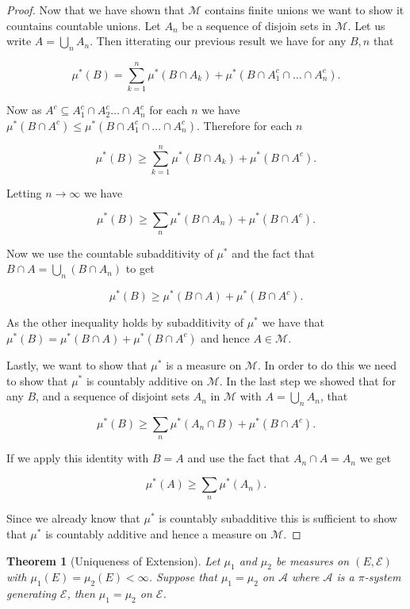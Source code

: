 \documentclass[
]{book}
\newtheorem{theorem}{Theorem}[chapter]
\theoremstyle{definition}
\theoremstyle{definition}
\theoremstyle{definition}
\theoremstyle{definition}
\theoremstyle{remark}
\begin{document}
\begin{proof}
Now that we have shown that \(\mathscr{M}\) contains finite unions we want to show it countains countable unions. Let \(A_n\) be a sequence of disjoin sets in \(\mathscr{M}\). Let us write \(A = \bigcup_n A_n\). Then itterating our previous result we have for any \(B, n\) that

\[ \mu^*(B) = \sum_{k=1}^n \mu^*(B \cap A_k) + \mu^*( B \cap A_1^c \cap \dots \cap A_n^c). \]

Now as \(A^c \subseteq A_1^c \cap A_2^c \dots \cap A_n^c\) for each \(n\) we have \(\mu^*(B \cap A^c) \leq \mu^*(B \cap A_1^c \cap \dots \cap A_n^c)\). Therefore for each \(n\)

\[ \mu^*(B) \geq \sum_{k=1}^n \mu^*(B \cap A_k) + \mu^*(B \cap A^c). \]

Letting \(n \rightarrow \infty\) we have

\[ \mu^*(B) \geq \sum_n \mu^*(B \cap A_n) + \mu^*(B \cap A^c). \]

Now we use the countable subadditivity of \(\mu^*\) and the fact that \(B \cap A = \bigcup_n (B \cap A_n)\) to get

\[ \mu^*(B) \geq \mu^*(B \cap A) + \mu^*(B \cap A^c). \]

As the other inequality holds by subadditivity of \(\mu^*\) we have that \(\mu^*(B) = \mu^*(B \cap A) + \mu^*(B \cap A^c)\) and hence \(A \in \mathscr{M}\).

Lastly, we want to show that \(\mu^*\) is a measure on \(\mathscr{M}\). In order to do this we need to show that \(\mu^*\) is countably additive on \(\mathscr{M}\). In the last step we showed that for any \(B\), and a sequence of disjoint sets \(A_n\) in \(\mathscr{M}\) with \(A= \bigcup_n A_n\), that

\[ \mu^*(B) \geq \sum_n \mu^*(A_n \cap B) + \mu^*(B \cap A^c). \]

If we apply this identity with \(B=A\) and use the fact that \(A_n \cap A = A_n\) we get

\[ \mu^*(A) \geq \sum_n \mu^*(A_n). \]

Since we already know that \(\mu^*\) is countably subadditive this is sufficient to show that \(\mu^*\) is countably additive and hence a measure on \(\mathscr{M}\).
\end{proof}

\begin{theorem}[Uniqueness of Extension]
Let \(\mu_1\) and \(\mu_2\) be measures on \((E,\mathcal{E})\) with \(\mu_1(E) = \mu_2(E) < \infty\). Suppose that \(\mu_1 = \mu_2\) on \(\mathcal{A}\) where \(\mathcal{A}\) is a \(\pi\)-system generating \(\mathcal{E}\), then \(\mu_1 = \mu_2\) on \(\mathcal{E}\).
\end{theorem}
\end{document}
